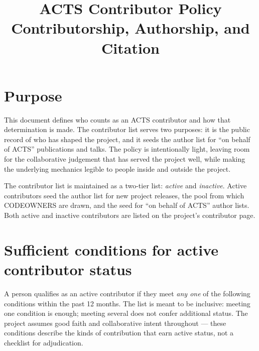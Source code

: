 \documentclass[11pt,a4paper]{article}
\title{ACTS Contributor Policy \\ \large Contributorship, Authorship, and Citation}
\author{}
\date{\docstamp}
\begin{document}
\maketitle
\thispagestyle{empty}

\section*{Purpose}

This document defines who counts as an ACTS contributor and how that determination
is made. The contributor list serves two purposes: it is the public record of who
has shaped the project, and it seeds the author list for ``on behalf of ACTS''
publications and talks. The policy is intentionally light, leaving room for the
collaborative judgement that has served the project well, while making the
underlying mechanics legible to people inside and outside the project.

The contributor list is maintained as a two-tier list: \emph{active} and
\emph{inactive}. Active contributors seed the author list for new project releases,
the pool from which CODEOWNERS are drawn, and the seed for ``on behalf of ACTS''
author lists. Both active and inactive contributors are listed on the project's
contributor page.

\section*{Sufficient conditions for active contributor status}

A person qualifies as an active contributor if they meet \emph{any one} of the
following conditions within the past 12 months. The list is meant to be inclusive:
meeting one condition is enough; meeting several does not confer additional status.
The project assumes good faith and collaborative intent throughout --- these
conditions describe the kinds of contribution that earn active status, not a
checklist for adjudication.
\end{document}
